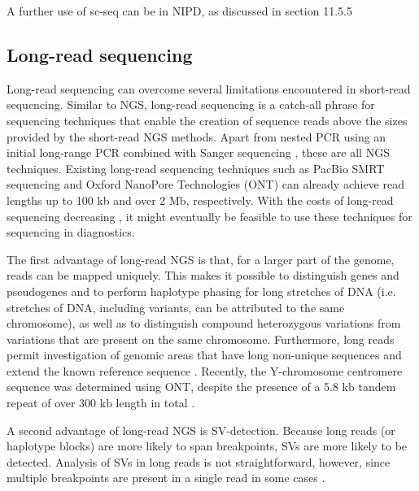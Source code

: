 A further use of sc-seq can be in NIPD, as discussed in section 11.5.5

\subsection{Long-read sequencing}
Long-read sequencing can overcome several limitations encountered in short-read sequencing.
Similar to NGS, long-read sequencing is a catch-all phrase for sequencing techniques that enable the creation of sequence reads above the sizes provided by the short-read NGS methods. 
Apart from nested PCR using an initial long-range PCR combined with Sanger sequencing \cite{Michalatos_Beloin_1996,Tan_2012}, these are all NGS techniques. 
Existing long-read sequencing techniques such as PacBio SMRT sequencing \cite{Chaisson_2014} and Oxford NanoPore Technologies (ONT) \cite{Jain_2018a,Nanopore_2018} can already achieve read lengths up to 100 kb and over 2 Mb, respectively. 
With the costs of long-read sequencing decreasing \cite{van_Dijk_2018}, it might eventually be feasible to use these techniques for sequencing in diagnostics.

The first advantage of long-read NGS is that, for a larger part of the genome, reads can be mapped uniquely. 
This makes it possible to distinguish genes and pseudogenes and to perform haplotype phasing for long stretches of DNA (i.e. stretches of DNA, including variants, can be attributed to the same chromosome), as well as to distinguish compound heterozygous variations from variations that are present on the same chromosome. 
Furthermore, long reads permit investigation of genomic areas that have long non-unique sequences and extend the known reference sequence \cite{Ameur_2018}. 
Recently, the Y-chromosome centromere sequence was determined using ONT, despite the presence of a 5.8 kb tandem repeat of over 300 kb length in total \cite{Jain_2018b}.

A second advantage of long-read NGS is SV-detection. Because long reads (or haplotype blocks) are more likely to span breakpoints, SVs are more likely to be detected. Analysis of SVs in long reads is not straightforward, however, since multiple breakpoints are present in a single read in some cases \cite{Gong_2018,Pollard_2018}.

